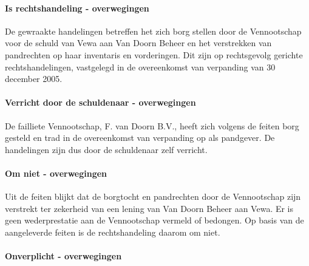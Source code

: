 \documentclass[
  dutch,
  a4paper,
]{article}
\begin{document}
\paragraph{Is rechtshandeling - overwegingen}\label{is-rechtshandeling---overwegingen-7}

De gewraakte handelingen betreffen het zich borg stellen door de Vennootschap voor de schuld van Vewa aan Van Doorn Beheer en het verstrekken van pandrechten op haar inventaris en vorderingen. Dit zijn op rechtsgevolg gerichte rechtshandelingen, vastgelegd in de overeenkomst van verpanding van 30 december 2005.

\paragraph{Verricht door de schuldenaar - overwegingen}\label{verricht-door-de-schuldenaar---overwegingen-7}

De failliete Vennootschap, F. van Doorn B.V., heeft zich volgens de feiten borg gesteld en trad in de overeenkomst van verpanding op als pandgever. De handelingen zijn dus door de schuldenaar zelf verricht.

\paragraph{Om niet - overwegingen}\label{om-niet---overwegingen-7}

Uit de feiten blijkt dat de borgtocht en pandrechten door de Vennootschap zijn verstrekt ter zekerheid van een lening van Van Doorn Beheer aan Vewa. Er is geen wederprestatie aan de Vennootschap vermeld of bedongen. Op basis van de aangeleverde feiten is de rechtshandeling daarom om niet.

\paragraph{Onverplicht - overwegingen}\label{onverplicht---overwegingen-7}
\end{document}
